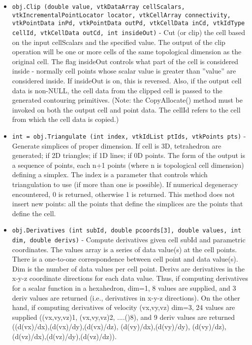 \begin{itemize}
\item  \verb|obj.Clip (double value, vtkDataArray cellScalars, vtkIncrementalPointLocator locator, vtkCellArray connectivity, vtkPointData inPd, vtkPointData outPd, vtkCellData inCd, vtkIdType cellId, vtkCellData outCd, int insideOut)| -  Cut (or clip) the cell based on the input cellScalars and the
 specified value. The output of the clip operation will be one or
 more cells of the same topological dimension as the original cell. 
 The flag insideOut controls what part of the cell is considered inside - 
 normally cell points whose scalar value is greater than ''value'' are
 considered inside. If insideOut is on, this is reversed. Also, if the 
 output cell data is non-NULL, the cell data from the clipped cell is 
 passed to the generated contouring primitives. (Note: the CopyAllocate() 
 method must be invoked on both the output cell and point data. The
 cellId refers to the cell from which the cell data is copied.)

\item  \verb|int = obj.Triangulate (int index, vtkIdList ptIds, vtkPoints pts)| -  Generate simplices of proper dimension. If cell is 3D, tetrahedron are 
 generated; if 2D triangles; if 1D lines; if 0D points. The form of the
 output is a sequence of points, each n+1 points (where n is topological 
 cell dimension) defining a simplex. The index is a parameter that controls
 which triangulation to use (if more than one is possible). If numerical
 degeneracy encountered, 0 is returned, otherwise 1 is returned.
 This method does not insert new points: all the points that define the
 simplices are the points that define the cell.

\item  \verb|obj.Derivatives (int subId, double pcoords[3], double values, int dim, double derivs)| -  Compute derivatives given cell subId and parametric coordinates. The
 values array is a series of data value(s) at the cell points. There is a
 one-to-one correspondence between cell point and data value(s). Dim is
 the number of data values per cell point. Derivs are derivatives in the
 x-y-z coordinate directions for each data value. Thus, if computing
 derivatives for a scalar function in a hexahedron, dim=1, 8 values are
 supplied, and 3 deriv values are returned (i.e., derivatives in x-y-z
 directions). On the other hand, if computing derivatives of velocity
 (vx,vy,vz) dim=3, 24 values are supplied ((vx,vy,vz)1, (vx,vy,vz)2,
 ....()8), and 9 deriv values are returned
 ((d(vx)/dx),(d(vx)/dy),(d(vx)/dz), (d(vy)/dx),(d(vy)/dy), (d(vy)/dz),
 (d(vz)/dx),(d(vz)/dy),(d(vz)/dz)).


\end{itemize}
